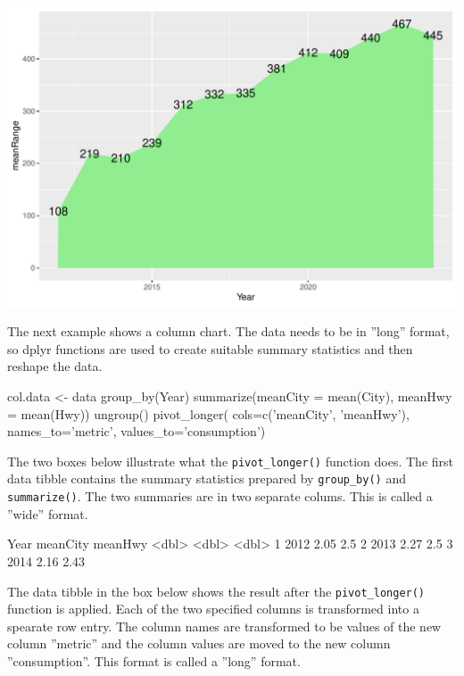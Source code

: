 \begin{center}
  \includegraphics[width=.8\textwidth]{fuel.areaOneSeries.pdf}
\end{center}

The next example shows a column chart. The data needs to be in ''long'' format, so dplyr functions are used to create suitable summary statistics and then reshape the data. 

\begin{Rcode}
col.data <- data %
   group_by(Year) %
   summarize(meanCity = mean(City), meanHwy = mean(Hwy)) %
   ungroup() %
   pivot_longer(
     cols=c('meanCity', 'meanHwy'), 
     names_to='metric', 
     values_to='consumption')
\end{Rcode}

The two boxes below illustrate what the \texttt{pivot\_longer()} function does. The first data tibble contains the summary statistics prepared by \texttt{group\_by()} and \texttt{summarize()}. The two summaries are in two separate colums. This is called a ''wide'' format. 

\begin{samepage}
\begin{textcode}
   Year meanCity meanHwy
  <dbl>    <dbl>   <dbl>
1  2012     2.05    2.5 
2  2013     2.27    2.5 
3  2014     2.16    2.43
\end{textcode}
\end{samepage}

The data tibble in the box below shows the result after the \texttt{pivot\_longer()} function is applied. Each of the two specified columns is transformed into a spearate row entry. The column names are transformed to be values of the new column ''metric'' and the column values are moved to the new column ''consumption''. This format is called a ''long'' format.

